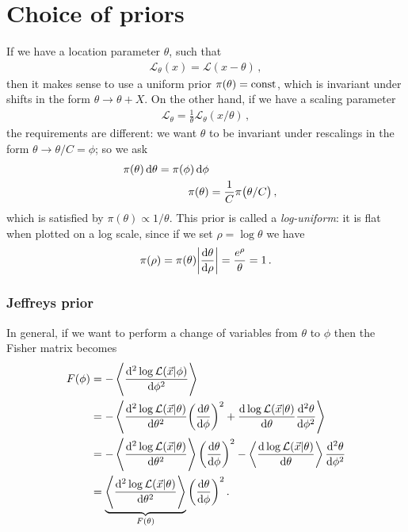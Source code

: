\documentclass[main.tex]{subfiles}
\begin{document}
\chapter{Choice of priors}


If we have a location parameter \(\theta \), such that 
%
\begin{align}
\mathcal{L}_\theta (x) = \mathcal{L} (x-\theta )
\,,
\end{align}
%
then it makes sense to use a uniform prior \(\pi (\theta ) = \text{const}\), which is invariant under shifts in the form \(\theta \to \theta + X\). 
On the other hand, if we have a scaling parameter 
%
\begin{align}
\mathcal{L}_\theta = \frac{1}{\theta } \mathcal{L}_\theta (x / \theta )
\,,
\end{align}
%
the requirements are different: we want \(\theta \) to be invariant under rescalings in the form \(\theta \to \theta/C = \phi \); so we ask 
%
\begin{align}
\pi (\theta ) \dd{\theta } = \pi (\phi ) \dd{\phi }  \\
\pi (\theta ) &= \frac{1}{C} \pi \qty(\theta / C)
\,,
\end{align}
%
which is satisfied by \(\pi (\theta ) \propto 1/\theta \). 
This prior is called a \emph{log-uniform}: it is flat when plotted on a log scale, since if we set \(\rho = \log \theta \) we have 
%
\begin{align}
\pi (\rho ) = \pi (\theta ) \abs{\dv{\theta }{\rho }} = \frac{e^{\rho }}{\theta }  = 1 
\,.
\end{align}

\subsection{Jeffreys prior}

In general, if we want to perform a change of variables from \(\theta  \) to \(\phi \) then the Fisher matrix becomes 
%
\begin{align}
F(\phi ) &= - \expval{\dv[2]{\log \mathcal{L}(\vec{x} | \phi )}{\phi}}  \\
&= - \expval{ \dv[2]{\log \mathcal{L}(\vec{x} | \theta )}{\theta} \qty(\dv{\theta }{\phi })^2 + \dv{\log \mathcal{L}(\vec{x} | \theta )}{\theta } \dv[2]{\theta }{\phi }}  \\
&= - \expval{\dv[2]{\log \mathcal{L}(\vec{x} | \theta )}{\theta }} 
\qty(\dv{\theta }{\phi })^2 - \expval{\dv{\log \mathcal{L}(\vec{x} | \theta )}{\theta }} \dv[2]{\theta }{\phi }  \\
&= \underbrace{\expval{\dv[2]{\log \mathcal{L}(\vec{x} | \theta )}{\theta }}}_{F(\theta )} 
\qty(\dv{\theta }{\phi })^2 
\,.
\end{align}
\end{document}
